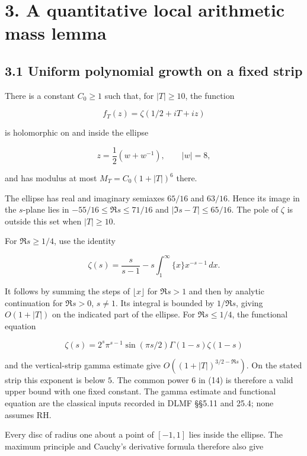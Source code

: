 \section{3. A quantitative local arithmetic mass
lemma}\label{a-quantitative-local-arithmetic-mass-lemma}

\subsection{3.1 Uniform polynomial growth on a fixed
strip}\label{uniform-polynomial-growth-on-a-fixed-strip}

There is a constant \(C_0\ge1\) such that, for \(|T|\ge10\), the
function

\[
 f_T(z)=\zeta(1/2+iT+iz)                                                \tag{14}
\]

is holomorphic on and inside the ellipse

\[
 z=\frac12(w+w^{-1}),\qquad |w|=8,
                                                                         \tag{15}
\]

and has modulus at most \(M_T=C_0(1+|T|)^6\) there.

The ellipse has real and imaginary semiaxes \(65/16\) and \(63/16\).
Hence its image in the \(s\)-plane lies in \(-55/16\le\Re s\le71/16\)
and \(|\Im s-T|\le65/16\). The pole of \(\zeta\) is outside this set
when \(|T|\ge10\).

For \(\Re s\ge1/4\), use the identity

\[
 \zeta(s)=\frac{s}{s-1}-s\int_1^\infty\{x\}x^{-s-1}\,dx.              \tag{16}
\]

It follows by summing the steps of \(\lfloor x\rfloor\) for \(\Re s>1\)
and then by analytic continuation for \(\Re s>0\), \(s\ne1\). Its
integral is bounded by \(1/\Re s\), giving \(O(1+|T|)\) on the indicated
part of the ellipse. For \(\Re s\le1/4\), the functional equation

\[
 \zeta(s)=2^s\pi^{s-1}\sin(\pi s/2)\Gamma(1-s)\zeta(1-s)              \tag{17}
\]

and the vertical-strip gamma estimate give \(O((1+|T|)^{3/2-\Re s})\).
On the stated strip this exponent is below \(5\). The common power \(6\)
in (14) is therefore a valid upper bound with one fixed constant. The
gamma estimate and functional equation are the classical inputs recorded
in DLMF §§5.11 and 25.4; none assumes RH.

Every disc of radius one about a point of \([-1,1]\) lies inside the
ellipse. The maximum principle and Cauchy's derivative formula therefore
also give

